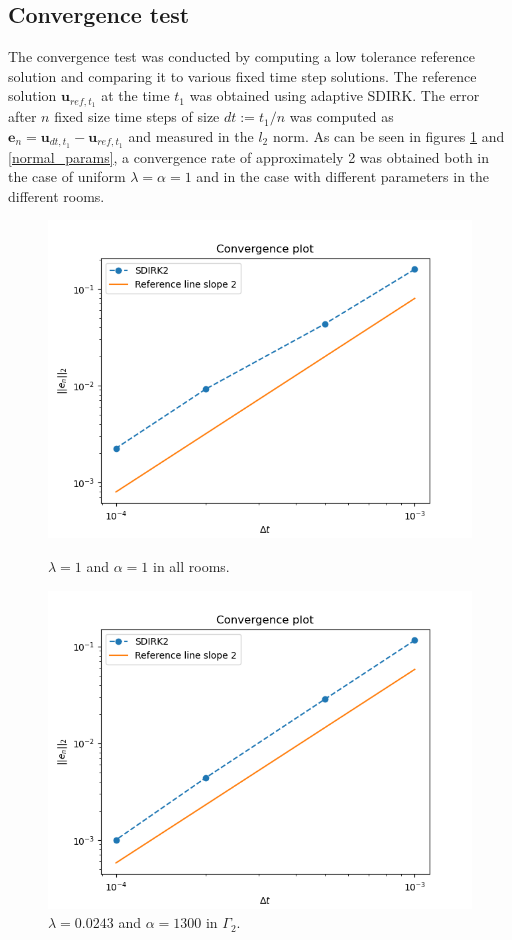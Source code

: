 \documentclass[]{article}
\begin{document}
\subsection{Convergence test}

The convergence test was conducted by computing a low tolerance reference solution and comparing it to various fixed time step solutions. The reference solution $\mathbf{u}_{ref, t_1}$ at the time $t_1$ was obtained using adaptive SDIRK. The error after $n$ fixed size time steps of size $dt := t_1 / n$ was computed as $\mathbf{e}_n = \mathbf{u}_{dt, t_1} - \mathbf{u}_{ref, t_1}$ and measured in the $l_2$ norm. As can be seen in figures \ref{odd_params} and \ref{normal_params}, a convergence rate of approximately 2 was obtained both in the case of uniform $\lambda=\alpha=1$ and in the case with different parameters in the different rooms.

\begin{figure}
	\includegraphics[width=\linewidth]{convergence.png}
	\caption{\label{normal_params} $\lambda = 1$ and $\alpha = 1$ in all rooms.}
	\includegraphics[width=\linewidth]{convergence_odd_params.png}
	\caption{\label{odd_params} $\lambda = 0.0243$ and $\alpha = 1300$ in $\Gamma_2$.}
\end{figure}
\end{document}
